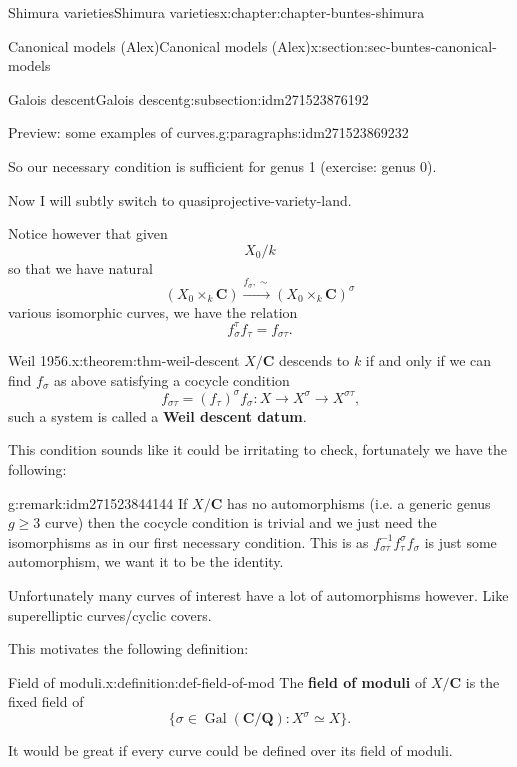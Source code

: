 \documentclass[oneside,10pt,]{book}
\newcommand{\terminology}[1]{\textbf{#1}}
\numberwithin{equation}{section}
\newcommand{\inv}{^{-1}}
\newcommand{\QQ}{\mathbf{Q}}
\newcommand{\CC}{\mathbf{C}}
\newcommand{\Gal}[2]{\operatorname{Gal}(#1/#2)}
\begin{document}
\begin{chapterptx}{Shimura varieties}{}{Shimura varieties}{}{}{x:chapter:chapter-buntes-shimura}
\begin{sectionptx}{Canonical models (Alex)}{}{Canonical models (Alex)}{}{}{x:section:sec-buntes-canonical-models}
\begin{subsectionptx}{Galois descent}{}{Galois descent}{}{}{g:subsection:idm271523876192}
\begin{paragraphs}{Preview: some examples of curves.}{g:paragraphs:idm271523869232}
\par
So our necessary condition is sufficient for genus 1 (exercise: genus 0).%
\end{paragraphs}%
\par
Now I will subtly switch to quasiprojective-variety-land.%
\par
Notice however that given%
\begin{equation*}
X_0/k
\end{equation*}
so that we have natural%
\begin{equation*}
(X_0 \times_k \CC) \xrightarrow{f_\sigma,\sim} (X_0 \times_k \CC)^\sigma
\end{equation*}
various isomorphic curves, we have the relation%
\begin{equation*}
f_\sigma^\tau f_\tau = f_{\sigma\tau}\text{.}
\end{equation*}
%
\begin{theorem}{Weil 1956.}{}{x:theorem:thm-weil-descent}%
\(X/\CC\) descends to \(k\) if and only if we can find \(f_\sigma\) as above satisfying a cocycle condition%
\begin{equation*}
f_{\sigma\tau} = (f_\tau)^\sigma f_\sigma\colon X \to X^\sigma \to X^{\sigma\tau}\text{,}
\end{equation*}
such a system is called a \terminology{Weil descent datum}.%
\end{theorem}
This condition sounds like it could be irritating to check, fortunately we have the following:%
\begin{remark}{}{g:remark:idm271523844144}%
If \(X/\CC\) has no automorphisms (i.e. a generic genus \(g \ge 3\) curve) then the cocycle condition is trivial and we just need the isomorphisms as in our first necessary condition. This is as \(f_{\sigma\tau}\inv f_\tau ^\sigma f_\sigma\) is just some automorphism, we want it to be the identity.%
\par
Unfortunately many curves of interest have a lot of automorphisms however. Like superelliptic curves\slash{}cyclic covers.%
\end{remark}
This motivates the following definition:%
\begin{definition}{Field of moduli.}{x:definition:def-field-of-mod}%
The \terminology{field of moduli} of \(X/\CC\) is the fixed field of%
\begin{equation*}
\{\sigma \in \Gal{\CC}{\QQ} : X^\sigma \simeq X\}\text{.}
\end{equation*}
%
\end{definition}
It would be great if every curve could be defined over its field of moduli.%

\end{subsectionptx}
\end{sectionptx}
\end{chapterptx}
\end{document}
